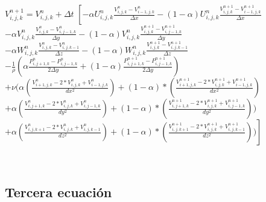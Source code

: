 \documentclass[a4paper]{article}
\begin{document}
\begin{enumerate}
$ {V}^{n+1}_{i,j,k} = V^{n}_{i,j,k} + \Delta t $
$ \left[ - \alpha {U}^{n}_{i,j,k} \frac{ {V}^{n}_{i,j,k} - V^{n}_{i-1,j,k}}{\Delta x} - (1 - \alpha) {U}^{n}_{i,j,k} \frac{ {V}^{n+1}_{i,j,k} - V^{n+1}_{i-1,j,k}}{ \Delta x} \right. $ 
\\
$- \alpha {V}^{n}_{i,j,k} \frac{ {V}^{n}_{i,j,k} - V^{n}_{i,j-1,k}}{ \Delta y} - (1 - \alpha) {V}^{n}_{i,j,k} \frac{ {V}^{n+1}_{i,j,k} - V^{n+1}_{i,j-1,k}}{ \Delta y}$
\\
$- \alpha {W}^{n}_{i,j,k} \frac{ {V}^{n}_{i,j,k} - V^{n}_{i,j,k-1}}{ \Delta z} - (1 - \alpha) {W}^{n}_{i,j,k} \frac{ {V}^{n+1}_{i,j,k} - V^{n+1}_{i,j,k-1}}{ \Delta z}$
\\
$- \frac{1}{\rho} ( \alpha \frac{P^{n}_{i,j+1,k} - P^{n}_{i,j-1,k} }{ 2 \Delta y } + (1 - \alpha) \frac{P^{n+1}_{i,j+1,k} - P^{n+1}_{i,j-1,k} }{ 2 \Delta y })  $
\\
$+ \nu (\alpha (\frac{ V^{n}_{i+1,j,k} - 2*V^{n}_{i,j,k} + V^{n}_{i-1,j,k}}{dx^2}) + (1-\alpha)*(\frac{ V^{n+1}_{i+1,j,k} - 2*V^{n+1}_{i,j,k} + V^{n+1}_{i-1,j,k}}{dx^2})$
\\
$ + \alpha (\frac{ V^{n}_{i,j+1,k} - 2*V^{n}_{i,j,k} + V^{n}_{i,j-1,k}}{dy^2}) + (1-\alpha)*(\frac{ V^{n+1}_{i,j+1,k} - 2*V^{n+1}_{i,j,k} + V^{n+1}_{i,j-1,k}}{dy^2})) $
\\
$\left. + \alpha (\frac{ V^{n}_{i,j,k+1} - 2*V^{n}_{i,j,k} + V^{n}_{i,j,k-1}}{dz^2}) + (1-\alpha)*(\frac{ V^{n+1}_{i,j,k+1} - 2*V^{n+1}_{i,j,k} + V^{n+1}_{i,j,k-1}}{dz^2})) \right]$

~\\
\end{enumerate}

\subsection{Tercera ecuación}
\end{document}
